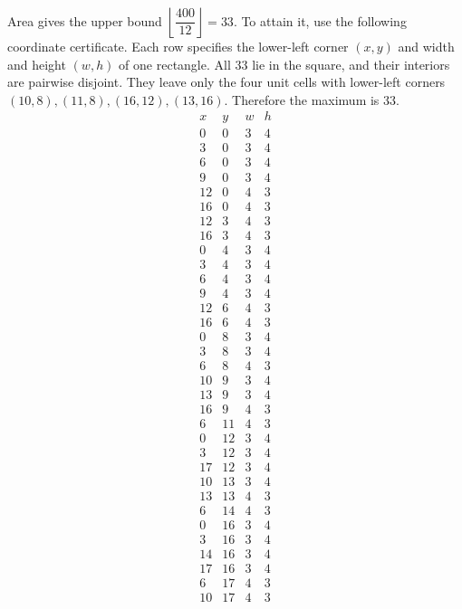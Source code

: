 Area gives the upper bound $\left\lfloor\dfrac{400}{12}\right\rfloor=33$. To attain it, use the following coordinate certificate. Each row specifies the lower-left corner $(x,y)$ and width and height $(w,h)$ of one rectangle. All 33 lie in the square, and their interiors are pairwise disjoint. They leave only the four unit cells with lower-left corners $(10,8),(11,8),(16,12),(13,16)$. Therefore the maximum is $\boxed{33}$.\[\begin{array}{rrrr}x&y&w&h\\\hline 0&0&3&4\\3&0&3&4\\6&0&3&4\\9&0&3&4\\12&0&4&3\\16&0&4&3\\12&3&4&3\\16&3&4&3\\0&4&3&4\\3&4&3&4\\6&4&3&4\\9&4&3&4\\12&6&4&3\\16&6&4&3\\0&8&3&4\\3&8&3&4\\6&8&4&3\\10&9&3&4\\13&9&3&4\\16&9&4&3\\6&11&4&3\\0&12&3&4\\3&12&3&4\\17&12&3&4\\10&13&3&4\\13&13&4&3\\6&14&4&3\\0&16&3&4\\3&16&3&4\\14&16&3&4\\17&16&3&4\\6&17&4&3\\10&17&4&3\end{array}\]

